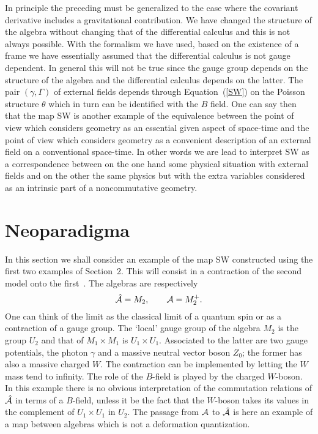 \documentclass[a4paper,12pt]{article}
\def\h#1{\hat #1}
\def\c#1{{\cal #1}}
\newcommand{\initiate}{\setcounter{equation}{0}}
\begin{document}
In principle the preceding must be generalized to the case where the
covariant derivative includes a gravitational contribution. We have
changed the structure of the algebra without changing that of the
differential calculus and this is not always possible.  With the
formalism we have used, based on the existence of a frame we have
essentially assumed that the differential calculus is not gauge
dependent. In general this will not be true since the gauge group
depends on the structure of the algebra and the differential calculus
depends on the latter.  The pair $(\gamma,\Gamma)$ of external fields
depends through Equation~(\ref{SW}) on the Poisson structure $\theta$
which in turn can be identified with the $B$ field.  One can say then
that the map SW is another example of the equivalence between the
point of view which considers geometry as an essential given aspect of
space-time and the point of view which considers geometry as a
convenient description of an external field on a conventional
space-time. In other words we are lead to interpret SW as a
correspondence between on the one hand some physical situation with
external fields and on the other the same physics but with the extra
variables considered as an intrinsic part of a noncommutative
geometry. 


\initiate
\section{Neoparadigma} 

In this section we shall consider an example of the map SW constructed
using the first two examples of Section~2. This will consist in a
contraction of the second model onto the first~\cite{MadMouSit97}.
The algebras are respectively 
$$
\h{\c{A}} = M_2, \qquad \c{A} = M^+_2.
$$
One can think of the limit as the classical limit of a quantum spin
or as a contraction of a gauge group.  The `local' gauge group of the
algebra $M_2$ is the group $U_2$ and that of $M_1 \times M_1$ is 
$U_1 \times U_1$.  Associated to the latter are two gauge potentials,
the photon $\gamma$ and a massive neutral vector boson $Z_0$; the
former has also a massive charged $W$.  The contraction can be
implemented by letting the $W$ mass tend to infinity.  The role of the
$B$-field is played by the charged $W$-boson. In this example there is
no obvious interpretation of the commutation relations of $\h{\c{A}}$
in terms of a $B$-field, unless it be the fact that the $W$-boson
takes its values in the complement of $U_1 \times U_1$ in $U_2$.  The
passage from $\c{A}$ to $\h{\c{A}}$ is here an example of a map
between algebras which is not a deformation quantization.
\end{document}
